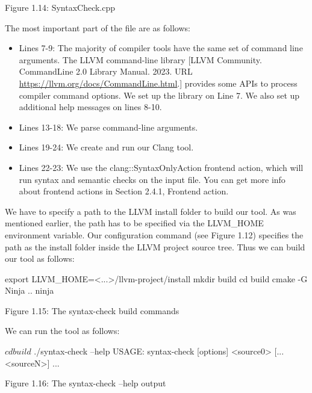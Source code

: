 \begin{center}
Figure 1.14: SyntaxCheck.cpp
\end{center}

The most important part of the file are as follows:

\begin{itemize}
\item
Lines 7-9: The majority of compiler tools have the same set of command line arguments. The LLVM command-line library [LLVM Community. CommandLine 2.0 Library Manual. 2023. URL \url{https://llvm.org/docs/CommandLine.html}.] provides some APIs to process compiler command options. We set up the library on Line 7. We also set up additional help messages on lines 8-10.

\item
Lines 13-18: We parse command-line arguments.

\item
Lines 19-24: We create and run our Clang tool.

\item
Lines 22-23: We use the clang::SyntaxOnlyAction frontend action, which will run syntax and semantic checks on the input file. You can get more info about frontend actions in Section 2.4.1, Frontend action.
\end{itemize}

We have to specify a path to the LLVM install folder to build our tool. As was mentioned earlier, the path has to be specified via the LLVM\_HOME environment variable. Our configuration command (see Figure 1.12) specifies the path as the install folder inside the LLVM project source tree. Thus we can build our tool as follows:

\begin{shell}
export LLVM_HOME=<...>/llvm-project/install
mkdir build
cd build
cmake -G Ninja ..
ninja
\end{shell}

\begin{center}
Figure 1.15: The syntax-check build commands
\end{center}

We can run the tool as follows:

\begin{shell}
$ cd build
$ ./syntax-check --help
USAGE: syntax-check [options] <source0> [... <sourceN>]
...
\end{shell}

\begin{center}
Figure 1.16: The syntax-check –help output
\end{center}

